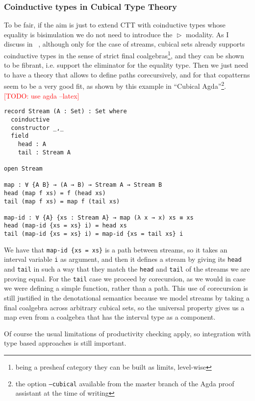 \documentclass{book}
\newcommand{\TODO}[1]{\textcolor{red}{[TODO: #1]}}
\DeclareMathOperator{\Later}{\vartriangleright}
\begin{document}
  \subsubsection{Coinductive types in Cubical Type Theory}
  To be fair, if the aim is just to extend CTT with coinductive types
  whose equality is bisimulation we do not need to introduce the
  $\Later$ modality. As I discuss in~\cite{vezzosi:streams17}
  , although only for the case of streams, cubical sets
  already supports coinductive types in the sense of strict final
  coalgebras\footnote{being a presheaf category they can be built as
    limits, level-wise}, and they can be shown to be fibrant,
  i.e. support the eliminator for the equality type.  Then we just
  need to have a theory that allows to define paths corecursively, and
  for that copatterns seem to be a very good fit, as shown by this
  example in ``Cubical Agda''\footnote{the option \texttt{--cubical} available from the master branch of the Agda proof assistant at the time of writing}.
  \TODO{use agda --latex}
\begin{verbatim}
record Stream (A : Set) : Set where
  coinductive
  constructor _,_
  field
    head : A
    tail : Stream A

open Stream

map : ∀ {A B} → (A → B) → Stream A → Stream B
head (map f xs) = f (head xs)
tail (map f xs) = map f (tail xs)

map-id : ∀ {A} {xs : Stream A} → map (λ x → x) xs ≡ xs
head (map-id {xs = xs} i) = head xs
tail (map-id {xs = xs} i) = map-id {xs = tail xs} i
\end{verbatim}
  We have that \verb|map-id {xs = xs}| is a path between streams, so it
  takes an interval variable \verb|i| as argument, and then it defines a
  stream by giving its \verb|head| and \verb|tail| in such a way that they match
  the \verb|head| and \verb|tail| of the streams we are proving equal.  For the
  \verb|tail| case we proceed by corecursion, as we would in case we were
  defining a simple function, rather than a path.  This use of
  corecursion is still justified in the denotational semantics because
  we model streams by taking a final coalgebra across arbitrary
  cubical sets, so the universal property gives us a map even from a coalgebra that
  has the interval type as a component.

  Of course the usual limitations of productivity checking apply, so
  integration with type based approaches is still important.

\end{document}
